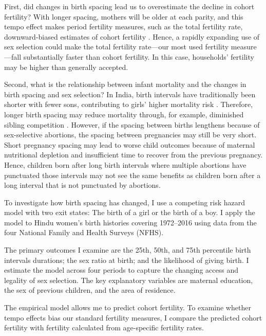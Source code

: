 \documentclass[12pt,letterpaper]{article}
\begin{document}
First, did changes in birth spacing lead us to overestimate the decline in cohort fertility?
With longer spacing, mothers will be older at each parity, and this tempo effect 
makes period fertility measures, such as the total fertility rate, downward-biased
estimates of cohort fertility \citep{Hotz1997,Bongaarts1999,Ni-Bhrolchain2011}.
Hence, a rapidly expanding use of sex selection could make the total fertility rate---our 
most used fertility measure---fall substantially faster than cohort fertility.
In this case, households' fertility may be higher than generally accepted.

Second, what is the relationship between infant mortality and the changes in birth spacing
and sex selection? 
In India, birth intervals have traditionally been shorter with fewer sons, contributing to 
girls' higher mortality risk
\citep{Whitworth2002,Bhalotra2008,Maitra2008,Jayachandran2011,Jayachandran2017a}. 
Therefore, longer birth spacing may reduce mortality through, for example, diminished 
sibling competition \citep{Conde-Agudelo2012,Molitoris2019}. 
However, if the spacing between births lengthens because of sex-selective abortions, the 
spacing between pregnancies may still be very short. 
Short pregnancy spacing may lead to worse child outcomes because of maternal nutritional 
depletion and insufficient time to recover from the previous pregnancy. 
Hence, children born after long birth intervals where multiple abortions have punctuated 
those intervals may not see the same benefits as children born after a long interval that 
is not punctuated by abortions.


To investigate how birth spacing has changed, I use a competing risk hazard model with 
two exit states: The birth of a girl or the birth of a boy. 
I apply the model to Hindu women's birth histories covering 1972--2016 using data from the 
four National Family and Health Surveys (NFHS). 

The primary outcomes I examine are the 25th, 50th, and 75th percentile birth intervals 
durations;
the sex ratio at birth; and the likelihood of giving birth. 
I estimate the model across four periods to capture the changing access and 
legality of sex selection. 
The key explanatory variables are maternal education, the sex of previous children, and 
the area of residence.

The empirical model allows me to predict cohort fertility. 
To examine whether tempo effects bias our standard fertility measures, I compare 
the predicted cohort fertility with fertility calculated from age-specific fertility 
rates.
\end{document}
